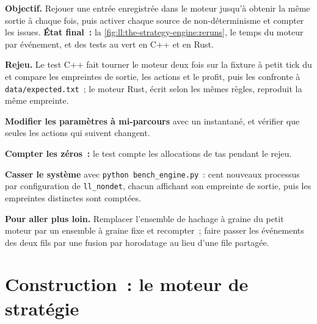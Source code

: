 \begin{tutorial}
\textbf{Objectif.} Rejouer une entrée enregistrée dans le moteur jusqu'à obtenir la même sortie à chaque fois, puis activer chaque source de
non-déterminisme et compter les issues. \textbf{État final~:} la \cref{fig:ll:the-strategy-engine:reruns}, le temps du moteur par
événement, et des tests au vert en C++ et en Rust.
\begin{tutsteps}
\item \textbf{Rejeu.} Le test C++ fait tourner le moteur deux fois sur la fixture à petit tick du  et compare les
empreintes de sortie, les actions et le profit, puis les confronte à \texttt{data/expected.txt}~; le moteur Rust, écrit selon les
mêmes règles, reproduit la même empreinte.
\item \textbf{Modifier les paramètres à mi-parcours} avec un instantané, et vérifier que seules les actions qui suivent changent.
\item \textbf{Compter les zéros~:} le test compte les allocations de tas pendant le rejeu.
\item \textbf{Casser le système} avec \texttt{python bench\_engine.py}~: cent nouveaux processus par configuration de \texttt{ll\_nondet},
chacun affichant son empreinte de sortie, puis les empreintes distinctes sont comptées.
\end{tutsteps}
\textbf{Pour aller plus loin.} Remplacer l'ensemble de hachage à graine du petit moteur par un ensemble à graine fixe et recompter~; faire passer les
événements des deux fils par une fusion par horodatage au lieu d'une file partagée.
\end{tutorial}

\section{Construction~: le moteur de stratégie}\label{bld:ll:the-strategy-engine:stratengine}

